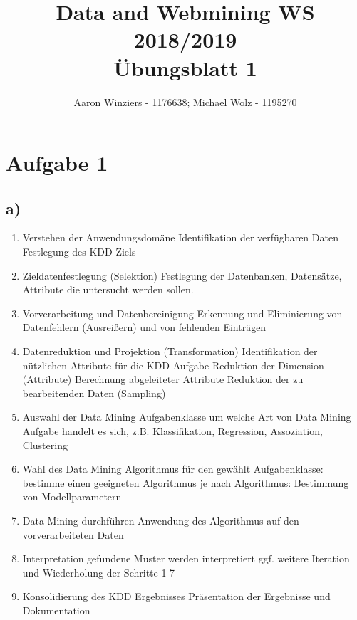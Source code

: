 \documentclass[11pt,a4paper,parskip=half ]{scrartcl}
\author{Aaron Winziers - 1176638; Michael Wolz - 1195270}
\title{Data and Webmining WS 2018/2019\\\LARGE{Übungsblatt 1}}
\begin{document}
	\maketitle
	
	\section*{Aufgabe 1}
	
	\subsection*{a)}
	\begin{enumerate}
		\item Verstehen der Anwendungsdomäne
		\subitem Identifikation der verfügbaren Daten
		\subitem Festlegung des KDD Ziels
		
		\item Zieldatenfestlegung (Selektion)
		\subitem Festlegung der Datenbanken, Datensätze, Attribute die untersucht werden sollen.
		
		\item Vorverarbeitung und Datenbereinigung
		\subitem Erkennung und Eliminierung von Datenfehlern (Ausreißern) und von fehlenden Einträgen
		
		\item Datenreduktion und Projektion (Transformation)
		\subitem Identifikation der nützlichen Attribute für die KDD Aufgabe
		\subitem Reduktion der Dimension (Attribute)
		\subitem Berechnung abgeleiteter Attribute
		\subitem Reduktion der zu bearbeitenden Daten (Sampling)
		
		\item Auswahl der Data Mining Aufgabenklasse
		\subitem um welche Art von Data Mining Aufgabe handelt es sich, z.B. Klassifikation, Regression, Assoziation, Clustering
		
		\item Wahl des Data Mining Algorithmus
		\subitem für den gewählt Aufgabenklasse: bestimme einen geeigneten Algorithmus
		\subitem je nach Algorithmus: Bestimmung von Modellparametern
		
		\item Data Mining durchführen
		\subitem Anwendung des Algorithmus auf den vorverarbeiteten Daten
		
		\item Interpretation
		\subitem gefundene Muster werden interpretiert
		\subitem ggf. weitere Iteration und Wiederholung der Schritte 1-7
		
		\item Konsolidierung des KDD Ergebnisses
		\subitem Präsentation der Ergebnisse und Dokumentation
	\end{enumerate}
	
\end{document}
